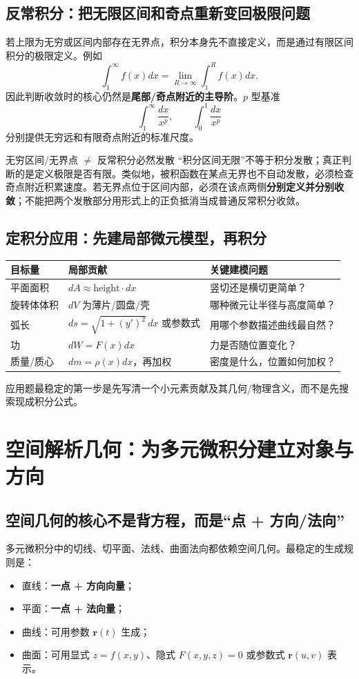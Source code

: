 \documentclass[11pt,a4paper,openany]{ctexbook}
\newcommand{\key}[1]{\textbf{\color{deep}#1}}
\begin{document}
\section{反常积分：把无限区间和奇点重新变回极限问题}
若上限为无穷或区间内部存在无界点，积分本身先不直接定义，而是通过有限区间积分的极限定义。例如
\[
\int_1^{\infty}f(x)dx=\lim_{R\to\infty}\int_1^R f(x)dx.
\]
因此判断收敛时的核心仍然是\key{尾部/奇点附近的主导阶}。$p$ 型基准
\[
\int_1^\infty \frac{dx}{x^p},\qquad \int_0^1\frac{dx}{x^p}
\]
分别提供无穷远和有限奇点附近的标准尺度。

\begin{boundarybox}{无穷区间/无界点 $\neq$ 反常积分必然发散}
“积分区间无限”不等于积分发散；真正判断的是定义极限是否有限。类似地，被积函数在某点无界也不自动发散，必须检查奇点附近积累速度。若无界点位于区间内部，必须在该点两侧\key{分别定义并分别收敛}；不能把两个发散部分用形式上的正负抵消当成普通反常积分收敛。
\end{boundarybox}

\section{定积分应用：先建局部微元模型，再积分}
\begin{longtable}{L{3.1cm}L{5.4cm}L{\dimexpr\linewidth-8.67cm\relax}}
\toprule
\textbf{目标量} & \textbf{局部贡献} & \textbf{关键建模问题}\\
\midrule
平面面积 & $dA\approx \text{height}\cdot dx$ & 竖切还是横切更简单？\\
旋转体体积 & $dV$ 为薄片/圆盘/壳 & 哪种微元让半径与高度简单？\\
弧长 & $ds=\sqrt{1+(y')^2}\,dx$ 或参数式 & 用哪个参数描述曲线最自然？\\
功 & $dW=F(x)dx$ & 力是否随位置变化？\\
质量/质心 & $dm=\rho(x)dx$，再加权 & 密度是什么，位置如何加权？\\
\bottomrule
\end{longtable}
应用题最稳定的第一步是先写清一个小元素贡献及其几何/物理含义，而不是先搜索现成积分公式。

\chapter{空间解析几何：为多元微积分建立对象与方向}

\section{空间几何的核心不是背方程，而是“点 + 方向/法向”}
多元微积分中的切线、切平面、法线、曲面法向都依赖空间几何。最稳定的生成规则是：
\begin{itemize}
  \item 直线：\key{一点 + 方向向量}；
  \item 平面：\key{一点 + 法向量}；
  \item 曲线：可用参数 $\bm r(t)$ 生成；
  \item 曲面：可用显式 $z=f(x,y)$、隐式 $F(x,y,z)=0$ 或参数式 $\bm r(u,v)$ 表示。
\end{itemize}
\end{document}

